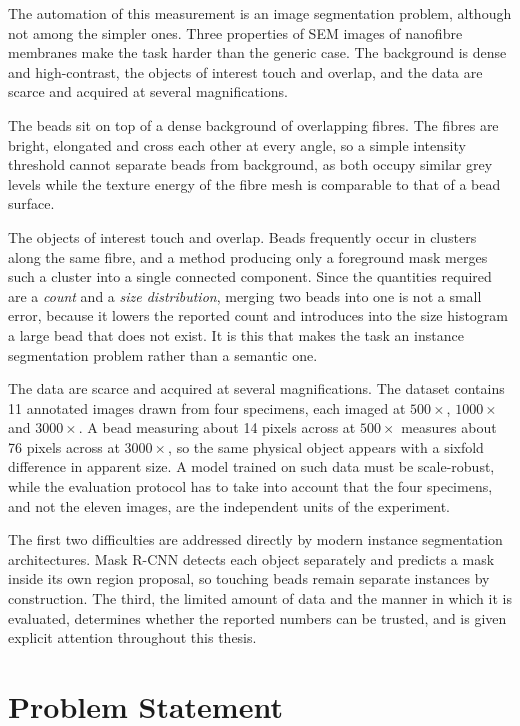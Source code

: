 The automation of this measurement is an image segmentation problem, although not
among the simpler ones. Three properties of SEM images of nanofibre membranes make
the task harder than the generic case. The background is dense and
high-contrast, the objects of interest touch and overlap, and the data are
scarce and acquired at several magnifications.

The beads sit on top of a dense background of overlapping fibres. The fibres are
bright, elongated and cross each other at every angle, so a simple intensity
threshold cannot separate beads from background, as both occupy similar grey
levels while the texture energy of the fibre mesh is comparable to that of a bead
surface.

The objects of interest touch and overlap. Beads frequently occur in clusters
along the same fibre, and a method producing only a foreground mask merges such a
cluster into a single connected component. Since the quantities required are a
\emph{count} and a \emph{size distribution}, merging two beads into one is not a
small error, because it lowers the reported count and introduces into the size
histogram a large bead that does not exist. It is this that makes the task an
instance segmentation problem rather than a semantic one.

The data are scarce and acquired at several magnifications. The dataset contains
11 annotated images drawn from four specimens, each imaged at $500\times$,
$1000\times$ and $3000\times$. A bead measuring about 14 pixels across at
$500\times$ measures about 76 pixels across at $3000\times$, so the same
physical object appears with a sixfold difference in apparent size. A model
trained on such data must be scale-robust, while the evaluation protocol has to
take into account that the four specimens, and not the eleven images, are the
independent units of the experiment.

The first two difficulties are addressed directly by modern instance segmentation
architectures. Mask R-CNN \cite{he2017mask} detects each object separately and
predicts a mask inside its own region proposal, so touching beads remain separate
instances by construction. The third, the limited amount of data and the manner in
which it is evaluated, determines whether the reported numbers can be trusted, and
is given explicit attention throughout this thesis.

\section{Problem Statement}

